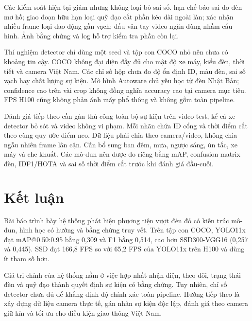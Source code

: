 \documentclass[11pt,a4paper]{article}
\newcommand{\code}[1]{{\small\texttt{\detokenize{#1}}}}
\begin{document}
Các kiểm soát hiện tại giảm nhưng không loại bỏ sai số. \code{UNKNOWN} hạn chế báo sai do đèn mơ hồ; giao đoạn hữu hạn loại quỹ đạo cắt phần kéo dài ngoài làn; xác nhận nhiều frame loại dao động gần vạch; dấu vân tay video ngăn dùng nhầm cấu hình. Ảnh bằng chứng và log hỗ trợ kiểm tra phần còn lại.

Thí nghiệm detector chỉ dùng một seed và tập con COCO nhỏ nên chưa có khoảng tin cậy. COCO không đại diện đầy đủ cho mật độ xe máy, kiểu đèn, thời tiết và camera Việt Nam. Các chỉ số hộp chưa đo độ ổn định ID, màu đèn, sai số vạch hay chất lượng sự kiện. Mô hình Autoware chủ yếu học từ đèn Nhật Bản; confidence cao trên vài crop không đồng nghĩa accuracy cao tại camera mục tiêu. FPS H100 cũng không phản ánh máy phổ thông và không gồm toàn pipeline.

Đánh giá tiếp theo cần gán thủ công toàn bộ sự kiện trên video test, kể cả xe detector bỏ sót và video không vi phạm. Mỗi nhãn chứa ID cổng và thời điểm cắt theo cùng quy ước điểm neo. Dữ liệu phải chia theo camera/video, không chia ngẫu nhiên frame lân cận. Cần bổ sung ban đêm, mưa, ngược sáng, ùn tắc, xe máy và che khuất. Các mô-đun nên được đo riêng bằng mAP, confusion matrix đèn, IDF1/HOTA và sai số thời điểm cắt trước khi đánh giá đầu-cuối.

\section{Kết luận}
Bài báo trình bày hệ thống phát hiện phương tiện vượt đèn đỏ có kiến trúc mô-đun, hình học có hướng và bằng chứng truy vết. Trên tập con COCO, YOLO11x đạt mAP@0.50:0.95 bằng 0,309 và F1 bằng 0,514, cao hơn SSD300-VGG16 (0,257 và 0,445). SSD đạt 166,8 FPS so với 65,2 FPS của YOLO11x trên H100 và dùng ít tham số hơn.

Giá trị chính của hệ thống nằm ở việc hợp nhất nhận diện, theo dõi, trạng thái đèn và quỹ đạo thành quyết định sự kiện có bằng chứng. Tuy nhiên, chỉ số detector chưa đủ để khẳng định độ chính xác toàn pipeline. Hướng tiếp theo là xây dựng dữ liệu camera thực tế, gán nhãn sự kiện độc lập, đánh giá theo camera giữ kín và tối ưu cho điều kiện giao thông Việt Nam.
\end{document}
